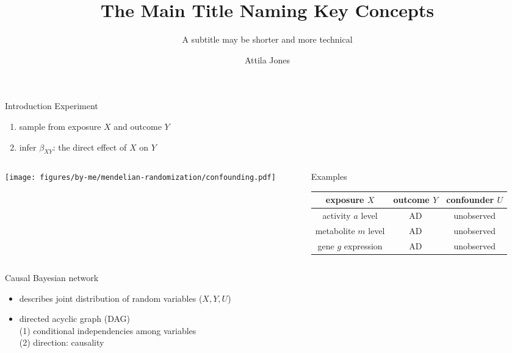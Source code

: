 \documentclass{beamer}
\title{The Main Title Naming Key Concepts}
\subtitle{A subtitle may be shorter and more technical}
\author{Attila Jones}
\date{}
\begin{document}
\begin{frame}{Introduction}
Experiment
\begin{enumerate}
\item sample from exposure $X$ and outcome $Y$
\item infer $\beta_{XY}$: the \alert{direct} effect of $X$ on $Y$
\end{enumerate}
\begin{columns}[t]
\begin{column}{0.3\textwidth}

\texttt{[image: figures/by-me/mendelian-randomization/confounding.pdf]}
\end{column}

\begin{column}{0.7\textwidth}
	\begin{center}
Examples
\end{center}

\footnotesize
\begin{tabular}{ccc}
exposure $X$ & outcome $Y$ & confounder $U$ \\
\hline
activity $a$ level & AD & unobserved \\
metabolite $m$ level & AD & unobserved \\
gene $g$ expression & AD & unobserved \\
\end{tabular}
\end{column}
\end{columns}
\vfill
\small
Causal Bayesian network
\begin{itemize}
\item describes joint distribution of random variables ($X, Y, U$)
\item directed acyclic graph (DAG)\\
	(1) conditional independencies among variables\\
	(2) direction: causality
\end{itemize}
\end{frame}
\end{document}
